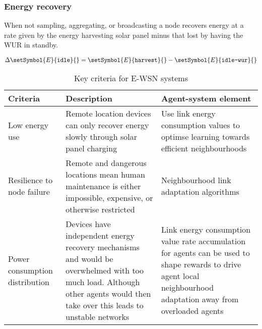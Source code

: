 \subsubsection{Energy recovery}

\newcommand{\setEnergyDeltaIdle}[2]{\Delta\setSymbol{E}{\texttt{idle}}{#2}}
\newcommand{\setEnergyHarvest}[2]{\setSymbol{E}{\texttt{harvest}}{#2}}
\newcommand{\setEnergyWUR}[2]{\setSymbol{E}{\texttt{idle-wur}}{#2}}

When not sampling, aggregating, or broadcasting a node recovers energy at a rate given by the energy harvesting solar panel minus that lost by having the WUR in standby.

\begin{equation}
	\setEnergyDeltaIdle{}{}
	= 
	\setEnergyHarvest{}{}
	-
	\setEnergyWUR{}{}
\end{equation}


\begin{table}
	\begin{tabular}{p{}p{} p{}}
		\hline
		\textbf{Criteria} & \textbf{Description} & \textbf{Agent-system element} \\
		\hline
		Low energy use & Remote location devices can only recover energy slowly through solar panel charging &  Use link energy consumption values to optimse learning towards efficient neighbourhoods \\
		Resilience to node failure & Remote and dangerous locations mean human maintenance is either impossible, expensive, or otherwise restricted & Neighbourhood link adaptation algorithms \\	
		Power consumption distribution & Devices have independent energy recovery mechanisms and would be overwhelmed with too much load. Although other agents would then take over this leads to unstable networks & Link energy consumption value rate accumulation for agents can be used to shape rewards to drive agent local neighbourhood adaptation away from overloaded agents  \\ 
		\hline
	\end{tabular}
	\caption{Key criteria for E-WSN systems}
	\label{table:real_world_systems_criteria}
\end{table}
